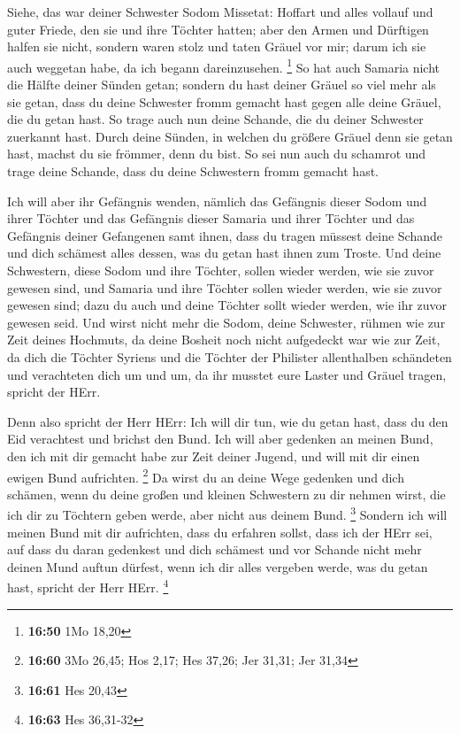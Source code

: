  Siehe, das war deiner Schwester Sodom Missetat: Hoffart
und alles vollauf und guter Friede, den sie und ihre Töchter hatten;
aber den Armen und Dürftigen halfen sie nicht,  sondern
waren stolz und taten Gräuel vor mir; darum ich sie auch weggetan habe,
da ich begann dareinzusehen. \footnote{\textbf{16:50} 1Mo 18,20}
 So hat auch Samaria nicht die Hälfte deiner Sünden getan;
sondern du hast deiner Gräuel so viel mehr als sie getan, dass du deine
Schwester fromm gemacht hast gegen alle deine Gräuel, die du getan hast.
 So trage auch nun deine Schande, die du deiner Schwester
zuerkannt hast. Durch deine Sünden, in welchen du größere Gräuel denn
sie getan hast, machst du sie frömmer, denn du bist. So sei nun auch du
schamrot und trage deine Schande, dass du deine Schwestern fromm gemacht
hast.

 Ich will aber ihr Gefängnis wenden, nämlich das Gefängnis
dieser Sodom und ihrer Töchter und das Gefängnis dieser Samaria und
ihrer Töchter und das Gefängnis deiner Gefangenen samt ihnen,
 dass du tragen müssest deine Schande und dich schämest
alles dessen, was du getan hast ihnen zum Troste.  Und
deine Schwestern, diese Sodom und ihre Töchter, sollen wieder werden,
wie sie zuvor gewesen sind, und Samaria und ihre Töchter sollen wieder
werden, wie sie zuvor gewesen sind; dazu du auch und deine Töchter sollt
wieder werden, wie ihr zuvor gewesen seid.  Und wirst nicht
mehr die Sodom, deine Schwester, rühmen wie zur Zeit deines Hochmuts,
 da deine Bosheit noch nicht aufgedeckt war wie zur Zeit,
da dich die Töchter Syriens und die Töchter der Philister allenthalben
schändeten und verachteten dich um und um,  da ihr musstet
eure Laster und Gräuel tragen, spricht der HErr.

 Denn also spricht der Herr HErr: Ich will dir tun, wie du
getan hast, dass du den Eid verachtest und brichst den Bund.
 Ich will aber gedenken an meinen Bund, den ich mit dir
gemacht habe zur Zeit deiner Jugend, und will mit dir einen ewigen Bund
aufrichten. \footnote{\textbf{16:60} 3Mo 26,45; Hos 2,17; Hes 37,26; Jer
  31,31; Jer 31,34}  Da wirst du an deine Wege gedenken und
dich schämen, wenn du deine großen und kleinen Schwestern zu dir nehmen
wirst, die ich dir zu Töchtern geben werde, aber nicht aus deinem Bund.
\footnote{\textbf{16:61} Hes 20,43}  Sondern ich will
meinen Bund mit dir aufrichten, dass du erfahren sollst, dass ich der
HErr sei,  auf dass du daran gedenkest und dich schämest
und vor Schande nicht mehr deinen Mund auftun dürfest, wenn ich dir
alles vergeben werde, was du getan hast, spricht der Herr HErr.
\footnote{\textbf{16:63} Hes 36,31-32}

